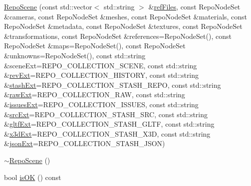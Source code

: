 \begin{DoxyCompactItemize}
\hyperlink{classrepo_1_1core_1_1model_1_1_repo_scene_a2747698490e0fd5db21fdedb2b910b56}{Repo\+Scene} (const std\+::vector$<$ std\+::string $>$ \&\hyperlink{classrepo_1_1core_1_1model_1_1_repo_scene_a72ff48bdd737480c5dd98edb4a39a557}{ref\+Files}, const Repo\+Node\+Set \&cameras, const Repo\+Node\+Set \&meshes, const Repo\+Node\+Set \&materials, const Repo\+Node\+Set \&metadata, const Repo\+Node\+Set \&textures, const Repo\+Node\+Set \&transformations, const Repo\+Node\+Set \&references=Repo\+Node\+Set(), const Repo\+Node\+Set \&maps=Repo\+Node\+Set(), const Repo\+Node\+Set \&unknowns=Repo\+Node\+Set(), const std\+::string \&scene\+Ext=R\+E\+P\+O\+\_\+\+C\+O\+L\+L\+E\+C\+T\+I\+O\+N\+\_\+\+S\+C\+E\+N\+E, const std\+::string \&\hyperlink{classrepo_1_1core_1_1model_1_1_repo_scene_ab33974cb8caec149fdd9743339f4d2ab}{rev\+Ext}=R\+E\+P\+O\+\_\+\+C\+O\+L\+L\+E\+C\+T\+I\+O\+N\+\_\+\+H\+I\+S\+T\+O\+R\+Y, const std\+::string \&\hyperlink{classrepo_1_1core_1_1model_1_1_repo_scene_a9e1ec4f9fa275647a75838361b3d2a5d}{stash\+Ext}=R\+E\+P\+O\+\_\+\+C\+O\+L\+L\+E\+C\+T\+I\+O\+N\+\_\+\+S\+T\+A\+S\+H\+\_\+\+R\+E\+P\+O, const std\+::string \&\hyperlink{classrepo_1_1core_1_1model_1_1_repo_scene_a19be566f3815da34dea4447f4d5b2dba}{raw\+Ext}=R\+E\+P\+O\+\_\+\+C\+O\+L\+L\+E\+C\+T\+I\+O\+N\+\_\+\+R\+A\+W, const std\+::string \&\hyperlink{classrepo_1_1core_1_1model_1_1_repo_scene_ade467377ddb29a8b7ea7347ed81ad0a4}{issues\+Ext}=R\+E\+P\+O\+\_\+\+C\+O\+L\+L\+E\+C\+T\+I\+O\+N\+\_\+\+I\+S\+S\+U\+E\+S, const std\+::string \&\hyperlink{classrepo_1_1core_1_1model_1_1_repo_scene_aaa568af1ee2cde77df38f4c3badb5981}{src\+Ext}=R\+E\+P\+O\+\_\+\+C\+O\+L\+L\+E\+C\+T\+I\+O\+N\+\_\+\+S\+T\+A\+S\+H\+\_\+\+S\+R\+C, const std\+::string \&\hyperlink{classrepo_1_1core_1_1model_1_1_repo_scene_a0de6d5d1c514db0e859b150feb312337}{gltf\+Ext}=R\+E\+P\+O\+\_\+\+C\+O\+L\+L\+E\+C\+T\+I\+O\+N\+\_\+\+S\+T\+A\+S\+H\+\_\+\+G\+L\+T\+F, const std\+::string \&\hyperlink{classrepo_1_1core_1_1model_1_1_repo_scene_ac55e20f143934e73afbca758b8d3d626}{x3d\+Ext}=R\+E\+P\+O\+\_\+\+C\+O\+L\+L\+E\+C\+T\+I\+O\+N\+\_\+\+S\+T\+A\+S\+H\+\_\+\+X3\+D, const std\+::string \&\hyperlink{classrepo_1_1core_1_1model_1_1_repo_scene_a979903ee1680863f4c67cf524bbc6e9f}{json\+Ext}=R\+E\+P\+O\+\_\+\+C\+O\+L\+L\+E\+C\+T\+I\+O\+N\+\_\+\+S\+T\+A\+S\+H\+\_\+\+J\+S\+O\+N)
\item 
\hyperlink{classrepo_1_1core_1_1model_1_1_repo_scene_aadddd2971dbdde53d01d736d77aebedf}{$\sim$\+Repo\+Scene} ()
\item 
bool \hyperlink{classrepo_1_1core_1_1model_1_1_repo_scene_a2ae2f478f17fe7dfeb20ad8befb3b2ee}{is\+O\+K} () const 

\end{DoxyCompactItemize}
